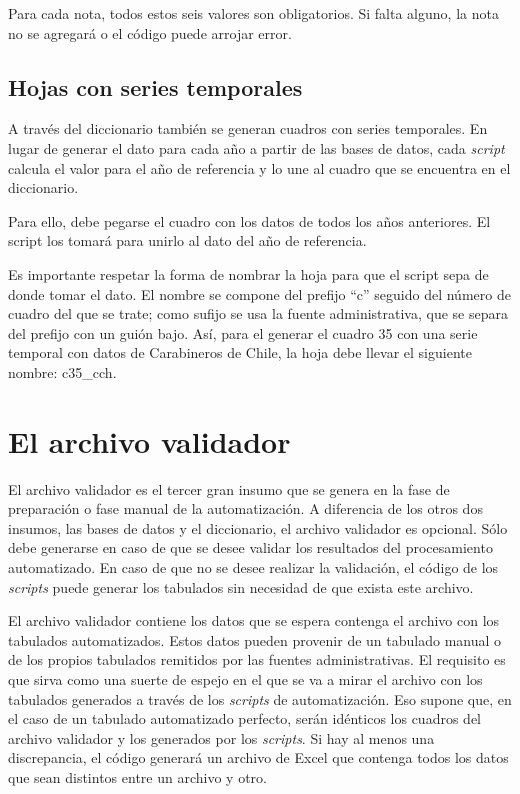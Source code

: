 \documentclass[
  spanish,
]{book}
\begin{document}
Para cada nota, todos estos seis valores son obligatorios. Si falta alguno, la nota no se agregará o el código puede arrojar error.

\hypertarget{hojas-con-series-temporales}{%
\section{Hojas con series temporales}\label{hojas-con-series-temporales}}

A través del diccionario también se generan cuadros con series temporales. En lugar de generar el dato para cada año a partir de las bases de datos, cada \emph{script} calcula el valor para el año de referencia y lo une al cuadro que se encuentra en el diccionario.

Para ello, debe pegarse el cuadro con los datos de todos los años anteriores. El script los tomará para unirlo al dato del año de referencia.

Es importante respetar la forma de nombrar la hoja para que el script sepa de donde tomar el dato. El nombre se compone del prefijo ``c'' seguido del número de cuadro del que se trate; como sufijo se usa la fuente administrativa, que se separa del prefijo con un guión bajo. Así, para el generar el cuadro 35 con una serie temporal con datos de Carabineros de Chile, la hoja debe llevar el siguiente nombre: c35\_cch.

\hypertarget{el-archivo-validador}{%
\chapter{El archivo validador}\label{el-archivo-validador}}

El archivo validador es el tercer gran insumo que se genera en la fase de preparación o fase manual de la automatización. A diferencia de los otros dos insumos, las bases de datos y el diccionario, el archivo validador es opcional. Sólo debe generarse en caso de que se desee validar los resultados del procesamiento automatizado. En caso de que no se desee realizar la validación, el código de los \emph{scripts} puede generar los tabulados sin necesidad de que exista este archivo.

El archivo validador contiene los datos que se espera contenga el archivo con los tabulados automatizados. Estos datos pueden provenir de un tabulado manual o de los propios tabulados remitidos por las fuentes administrativas. El requisito es que sirva como una suerte de espejo en el que se va a mirar el archivo con los tabulados generados a través de los \emph{scripts} de automatización. Eso supone que, en el caso de un tabulado automatizado perfecto, serán idénticos los cuadros del archivo validador y los generados por los \emph{scripts}. Si hay al menos una discrepancia, el código generará un archivo de Excel que contenga todos los datos que sean distintos entre un archivo y otro.
\end{document}
